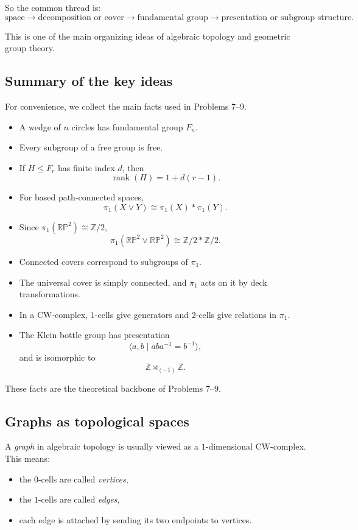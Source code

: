 \documentclass[12pt,a4paper]{article}
\DeclareMathOperator{\rank}{rank}
\theoremstyle{notespace}
\begin{document}
\medskip

So the common thread is:
\[
\text{space}
\longrightarrow
\text{decomposition or cover}
\longrightarrow
\text{fundamental group}
\longrightarrow
\text{presentation or subgroup structure}.
\]

This is one of the main organizing ideas of algebraic topology and geometric group theory.

\subsection{Summary of the key ideas}

For convenience, we collect the main facts used in Problems 7--9.

\begin{itemize}
	\item A wedge of \(n\) circles has fundamental group \(F_n\).
	\item Every subgroup of a free group is free.
	\item If \(H\leq F_r\) has finite index \(d\), then
	\[
	\rank(H)=1+d(r-1).
	\]
	\item For based path-connected spaces,
	\[
	\pi_1(X\vee Y)\cong \pi_1(X)*\pi_1(Y).
	\]
	\item Since \(\pi_1(\mathbb{RP}^2)\cong \mathbb Z/2\),
	\[
	\pi_1(\mathbb{RP}^2\vee \mathbb{RP}^2)\cong \mathbb Z/2 * \mathbb Z/2.
	\]
	\item Connected covers correspond to subgroups of \(\pi_1\).
	\item The universal cover is simply connected, and \(\pi_1\) acts on it by deck transformations.
	\item In a CW-complex, \(1\)-cells give generators and \(2\)-cells give relations in \(\pi_1\).
	\item The Klein bottle group has presentation
	\[
	\langle a,b\mid aba^{-1}=b^{-1}\rangle,
	\]
	and is isomorphic to
	\[
	\mathbb Z\rtimes_{(-1)}\mathbb Z.
	\]
\end{itemize}

These facts are the theoretical backbone of Problems 7--9.


\subsection{Graphs as topological spaces}

A \emph{graph} in algebraic topology is usually viewed as a \(1\)-dimensional CW-complex. This means:

\begin{itemize}
	\item the \(0\)-cells are called \emph{vertices},
	\item the \(1\)-cells are called \emph{edges},
	\item each edge is attached by sending its two endpoints to vertices.
\end{itemize}
\end{document}
